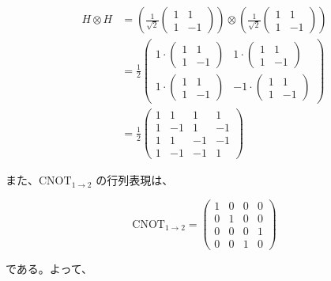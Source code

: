 \documentclass[11pt,a4paper]{ltjsarticle}
\begin{document}
\begin{align*}
H \otimes H
&= \left( \frac{1}{\sqrt{2}}
\begin{pmatrix}
1 & 1 \\
1 & -1
\end{pmatrix} \right)
\otimes
\left( \frac{1}{\sqrt{2}}
\begin{pmatrix}
1 & 1 \\
1 & -1
\end{pmatrix} \right) \\
&= \frac{1}{2}
\begin{pmatrix}
1 \cdot
\begin{pmatrix}
1 & 1 \\
1 & -1
\end{pmatrix}
&
1 \cdot
\begin{pmatrix}
1 & 1 \\
1 & -1
\end{pmatrix}
\\
1 \cdot
\begin{pmatrix}
1 & 1 \\
1 & -1
\end{pmatrix}
&
-1 \cdot
\begin{pmatrix}
1 & 1 \\
1 & -1
\end{pmatrix}
\end{pmatrix} \\
&= \frac{1}{2}
\begin{pmatrix}
1 & 1 & 1 & 1 \\
1 & -1 & 1 & -1 \\
1 & 1 & -1 & -1 \\
1 & -1 & -1 & 1
\end{pmatrix}
\end{align*}

また、$\mathrm{CNOT}_{1 \to 2}$ の行列表現は、

\[
\mathrm{CNOT}_{1 \to 2} =
\begin{pmatrix}
1 & 0 & 0 & 0 \\
0 & 1 & 0 & 0 \\
0 & 0 & 0 & 1 \\
0 & 0 & 1 & 0
\end{pmatrix}
\]

である。よって、
\end{document}
